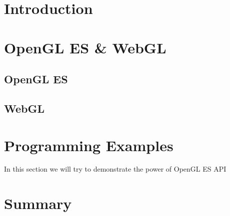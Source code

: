 \documentclass[a4paper,11pt]{article}
\begin{document}


\section{Introduction} 



\pagebreak[3]
\section{OpenGL ES \& WebGL}



%

\pagebreak[3] 
\subsection{OpenGL ES}


\pagebreak[3] 
\subsection{WebGL}


\clearpage 
\section{Programming Examples} 

In this section we will try to demonstrate the power of OpenGL ES API




\section{Summary} 


\clearpage
\label{Bibliography} 
%

 
%
\end{document}
